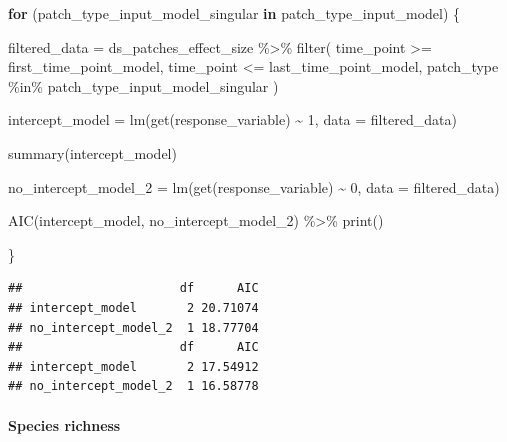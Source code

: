\documentclass[
]{article}
\newenvironment{Shaded}{\begin{snugshade}}{\end{snugshade}}
\newcommand{\AttributeTok}[1]{\textcolor[rgb]{0.77,0.63,0.00}{#1}}
\newcommand{\ControlFlowTok}[1]{\textcolor[rgb]{0.13,0.29,0.53}{\textbf{#1}}}
\newcommand{\DecValTok}[1]{\textcolor[rgb]{0.00,0.00,0.81}{#1}}
\newcommand{\FunctionTok}[1]{\textcolor[rgb]{0.00,0.00,0.00}{#1}}
\newcommand{\NormalTok}[1]{#1}
\newcommand{\OtherTok}[1]{\textcolor[rgb]{0.56,0.35,0.01}{#1}}
\newcommand{\SpecialCharTok}[1]{\textcolor[rgb]{0.00,0.00,0.00}{#1}}
\begin{document}
\begin{Shaded}
\begin{Highlighting}[]
\ControlFlowTok{for}\NormalTok{ (patch\_type\_input\_model\_singular }\ControlFlowTok{in}\NormalTok{ patch\_type\_input\_model) \{}
  
\NormalTok{  filtered\_data }\OtherTok{=}\NormalTok{ ds\_patches\_effect\_size }\SpecialCharTok{\%\textgreater{}\%}
    \FunctionTok{filter}\NormalTok{(}
\NormalTok{        time\_point }\SpecialCharTok{\textgreater{}=}\NormalTok{ first\_time\_point\_model,}
\NormalTok{        time\_point }\SpecialCharTok{\textless{}=}\NormalTok{ last\_time\_point\_model,}
\NormalTok{        patch\_type }\SpecialCharTok{\%in\%}\NormalTok{ patch\_type\_input\_model\_singular}
\NormalTok{    )}
  
\NormalTok{  intercept\_model }\OtherTok{=} \FunctionTok{lm}\NormalTok{(}\FunctionTok{get}\NormalTok{(response\_variable) }\SpecialCharTok{\textasciitilde{}}
                         \DecValTok{1}\NormalTok{,}
                       \AttributeTok{data =}\NormalTok{ filtered\_data)}
  
  \FunctionTok{summary}\NormalTok{(intercept\_model)}
  
\NormalTok{  no\_intercept\_model\_2 }\OtherTok{=} \FunctionTok{lm}\NormalTok{(}\FunctionTok{get}\NormalTok{(response\_variable) }\SpecialCharTok{\textasciitilde{}}
                              \DecValTok{0}\NormalTok{,}
                            \AttributeTok{data =}\NormalTok{ filtered\_data)}
  
  \FunctionTok{AIC}\NormalTok{(intercept\_model, no\_intercept\_model\_2) }\SpecialCharTok{\%\textgreater{}\%}
    \FunctionTok{print}\NormalTok{()}
  
\NormalTok{\}}
\end{Highlighting}
\end{Shaded}

\begin{verbatim}
##                      df      AIC
## intercept_model       2 20.71074
## no_intercept_model_2  1 18.77704
##                      df      AIC
## intercept_model       2 17.54912
## no_intercept_model_2  1 16.58778
\end{verbatim}

\hypertarget{species-richness-2}{%
\paragraph{Species richness}\label{species-richness-2}}
\end{document}
